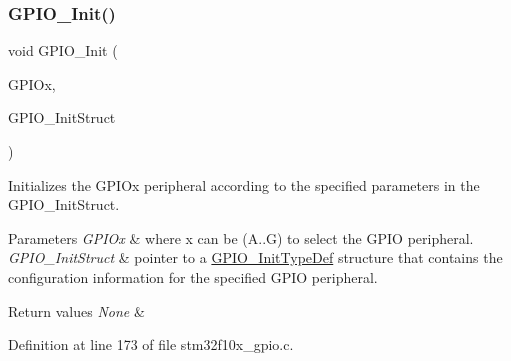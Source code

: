 \mbox{\label{group___g_p_i_o___private___functions_ga71abf9404261370d03cca449b88d3a65}} 
\subsubsection{\texorpdfstring{G\+P\+I\+O\+\_\+\+Init()}{GPIO\_Init()}}
{\footnotesize\ttfamily void G\+P\+I\+O\+\_\+\+Init (\begin{DoxyParamCaption}\item[{\hyperlink{struct_g_p_i_o___type_def}{G\+P\+I\+O\+\_\+\+Type\+Def} $\ast$}]{G\+P\+I\+Ox,  }\item[{\hyperlink{struct_g_p_i_o___init_type_def}{G\+P\+I\+O\+\_\+\+Init\+Type\+Def} $\ast$}]{G\+P\+I\+O\+\_\+\+Init\+Struct }\end{DoxyParamCaption})}



Initializes the G\+P\+I\+Ox peripheral according to the specified parameters in the G\+P\+I\+O\+\_\+\+Init\+Struct. 


\begin{DoxyParams}{Parameters}
{\em G\+P\+I\+Ox} & where x can be (A..G) to select the G\+P\+IO peripheral. \\
\hline
{\em G\+P\+I\+O\+\_\+\+Init\+Struct} & pointer to a \hyperlink{struct_g_p_i_o___init_type_def}{G\+P\+I\+O\+\_\+\+Init\+Type\+Def} structure that contains the configuration information for the specified G\+P\+IO peripheral. \\
\hline
\end{DoxyParams}

\begin{DoxyRetVals}{Return values}
{\em None} & \\
\hline
\end{DoxyRetVals}


Definition at line 173 of file stm32f10x\+\_\+gpio.\+c.

